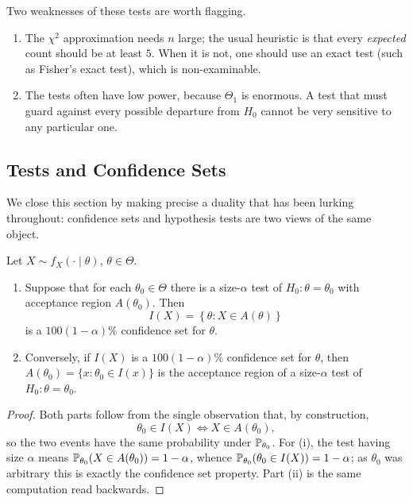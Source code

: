 \documentclass[a4paper]{scrartcl}
\begin{document}
\begin{remark}
  Two weaknesses of these tests are worth flagging.
  \begin{enumerate}[label=(\roman*)]
    \item The $\chi^2$ approximation needs $n$ large; the usual heuristic is that every \emph{expected} count should be at least $5$. When it is not, one should use an exact test (such as Fisher's exact test), which is non-examinable.
    \item The tests often have low power, because $\Theta_1$ is enormous. A test that must guard against every possible departure from $H_0$ cannot be very sensitive to any particular one.
  \end{enumerate}
\end{remark}

\subsection{Tests and Confidence Sets}

We close this section by making precise a duality that has been lurking throughout: confidence sets and hypothesis tests are two views of the same object.

\begin{theorem}
  Let $X \sim f_X(\cdot\mid\theta)$, $\theta \in \Theta$.
  \begin{enumerate}[label=(\roman*)]
    \item Suppose that for each $\theta_0 \in \Theta$ there is a size-$\alpha$ test of $H_0 : \theta = \theta_0$ with acceptance region $A(\theta_0)$. Then
    $$
    I(X) = \left\{\theta : X \in A(\theta)\right\}
    $$
    is a $100(1-\alpha)\%$ confidence set for $\theta$.
    \item Conversely, if $I(X)$ is a $100(1-\alpha)\%$ confidence set for $\theta$, then $A(\theta_0) = \{x : \theta_0 \in I(x)\}$ is the acceptance region of a size-$\alpha$ test of $H_0 : \theta = \theta_0$.
  \end{enumerate}
\end{theorem}
\begin{proof}
  Both parts follow from the single observation that, by construction,
  $$
  \theta_0 \in I(X) \iff X \in A(\theta_0),
  $$
  so the two events have the same probability under $\mathbb{P}_{\theta_0}$. For (i), the test having size $\alpha$ means $\mathbb{P}_{\theta_0}(X\in A(\theta_0)) = 1-\alpha$, whence $\mathbb{P}_{\theta_0}(\theta_0 \in I(X)) = 1-\alpha$; as $\theta_0$ was arbitrary this is exactly the confidence set property. Part (ii) is the same computation read backwards.
\end{proof}
\end{document}
